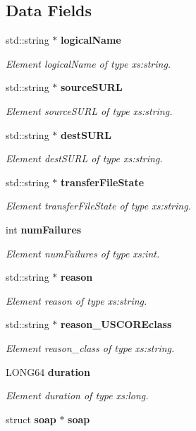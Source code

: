 \subsection*{Data Fields}
\begin{DoxyCompactItemize}
\item 
std::string $\ast$ {\bf logicalName}
\begin{DoxyCompactList}\small\item\em Element logicalName of type xs:string. \item\end{DoxyCompactList}\item 
std::string $\ast$ {\bf sourceSURL}
\begin{DoxyCompactList}\small\item\em Element sourceSURL of type xs:string. \item\end{DoxyCompactList}\item 
std::string $\ast$ {\bf destSURL}
\begin{DoxyCompactList}\small\item\em Element destSURL of type xs:string. \item\end{DoxyCompactList}\item 
std::string $\ast$ {\bf transferFileState}
\begin{DoxyCompactList}\small\item\em Element transferFileState of type xs:string. \item\end{DoxyCompactList}\item 
int {\bf numFailures}
\begin{DoxyCompactList}\small\item\em Element numFailures of type xs:int. \item\end{DoxyCompactList}\item 
std::string $\ast$ {\bf reason}
\begin{DoxyCompactList}\small\item\em Element reason of type xs:string. \item\end{DoxyCompactList}\item 
std::string $\ast$ {\bf reason\_\-USCOREclass}
\begin{DoxyCompactList}\small\item\em Element reason\_\-class of type xs:string. \item\end{DoxyCompactList}\item 
LONG64 {\bf duration}
\begin{DoxyCompactList}\small\item\em Element duration of type xs:long. \item\end{DoxyCompactList}\item 
struct {\bf soap} $\ast$ {\bf soap}\label{classtransfer____FileTransferStatus_ac370aec106125a2bdca5ef67bed75868}


\end{DoxyCompactItemize}
